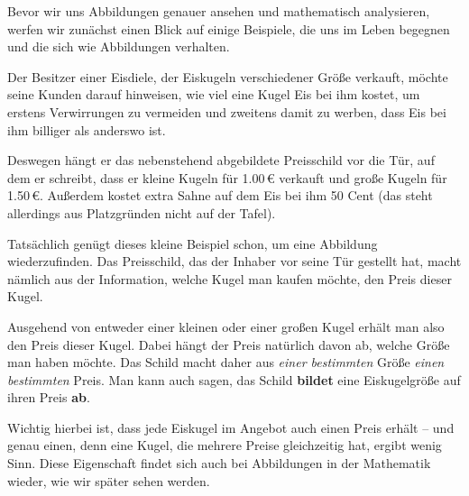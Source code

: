\documentclass[../../main.tex]{subfiles}
\begin{document}
Bevor wir uns Abbildungen genauer ansehen und mathematisch analysieren, werfen wir zunächst einen Blick auf einige Beispiele, die uns im Leben begegnen und die sich wie Abbildungen verhalten.

\begin{example}
    Der Besitzer einer Eisdiele, der Eiskugeln verschiedener Größe verkauft, möchte seine Kunden darauf hinweisen, wie viel eine Kugel Eis bei ihm kostet, um erstens Verwirrungen zu vermeiden und zweitens damit zu werben, dass Eis bei ihm billiger als anderswo ist.
    
    Deswegen hängt er das nebenstehend abgebildete Preisschild vor die Tür, auf dem er schreibt, dass er kleine Kugeln für 1.00\,\euro{} verkauft und große Kugeln für 1.50\,\euro. Außerdem kostet extra Sahne auf dem Eis bei ihm 50 Cent (das steht allerdings aus Platzgründen nicht auf der Tafel).
    
    Tatsächlich genügt dieses kleine Beispiel schon, um eine Abbildung wiederzufinden. Das Preisschild, das der Inhaber vor seine Tür gestellt hat, macht nämlich aus der Information, welche Kugel man kaufen möchte, den Preis dieser Kugel.
    
    Ausgehend von entweder einer kleinen oder einer großen Kugel erhält man also den Preis dieser Kugel. Dabei hängt der Preis natürlich davon ab, welche Größe man haben möchte. Das Schild macht daher aus \emph{einer bestimmten} Größe \emph{einen bestimmten} Preis. Man kann auch sagen, das Schild \textbf{bildet} eine Eiskugelgröße auf ihren Preis \textbf{ab}. 
    
    Wichtig hierbei ist, dass jede Eiskugel im Angebot auch einen Preis erhält -- und genau einen, denn eine Kugel, die mehrere Preise gleichzeitig hat, ergibt wenig Sinn. Diese Eigenschaft findet sich auch bei Abbildungen in der Mathematik wieder, wie wir später sehen werden.
\end{example}
\end{document}
